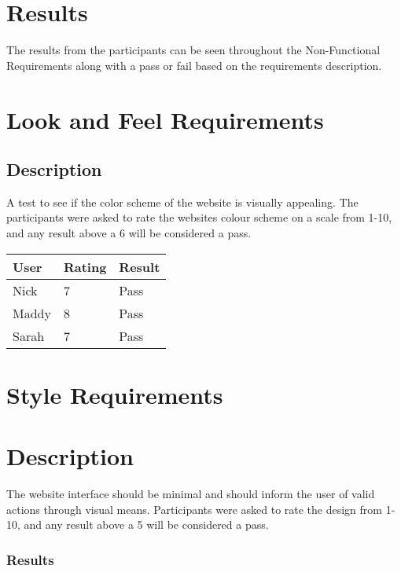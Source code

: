 \documentclass{scrreprt}
\begin{document}
\section{Results}
\begin{flushleft}
The results from the participants can be seen throughout the Non-Functional Requirements along with a pass or fail based on the requirements description.
\end{flushleft}

\section{Look and Feel Requirements}
\subsection{Description}
\begin{flushleft}
A test to see if the color scheme of the website is visually appealing. The participants were asked to rate the websites colour scheme on a scale from 1-10, and any result above a 6 will be considered a pass.
\end{flushleft}
 
 \centering
 \begin{tabular}{||p{2.5cm}|p{2.5cm}|p{2.5cm}||}
 \hline
 \bf User & \bf Rating & \bf Result\\
 \hline\hline
 Nick & 7 & Pass \\
 \hline
 Maddy & 8 & Pass\\ %
 \hline
 Sarah & 7 & Pass \\
 \hline
 \end{tabular}

\section{Style Requirements}
\section{Description}
\begin{flushleft}
The website interface should be minimal and should inform the user of valid actions through visual means. Participants were asked to rate the design from 1-10, and any result above a 5 will be considered a pass.
\subsubsection{Results}
\end{flushleft}
 
\end{document}
